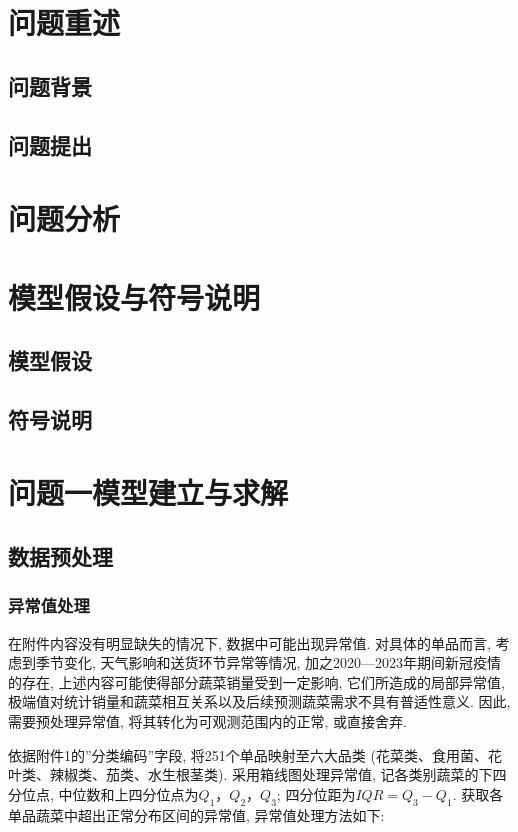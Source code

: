 \documentclass{MathNoteCN}
\begin{document}
\section{问题重述}%
\subsection{问题背景}
\subsection{问题提出}
\section{问题分析}%
\section{模型假设与符号说明}%
\subsection{模型假设}
\subsection{符号说明}
\section{问题一模型建立与求解}%

\subsection{数据预处理}

\subsubsection{异常值处理}
在附件内容没有明显缺失的情况下, 数据中可能出现异常值. 对具体的单品而言, 考虑到季节变化, 天气影响和送货环节异常等情况, 加之2020—2023年期间新冠疫情的存在, 上述内容可能使得部分蔬菜销量受到一定影响, 它们所造成的局部异常值, 极端值对统计销量和蔬菜相互关系以及后续预测蔬菜需求不具有普适性意义. 因此, 需要预处理异常值, 将其转化为可观测范围内的正常, 或直接舍弃. 

依据附件1的''分类编码''字段, 将251个单品映射至六大品类 (花菜类、食用菌、花叶类、辣椒类、茄类、水生根茎类). 采用箱线图处理异常值, 记各类别蔬菜的下四分位点, 中位数和上四分位点为$Q_1$，$Q_2$，$Q_3$; 四分位距为$IQR=Q_3-Q_1$. 获取各单品蔬菜中超出正常分布区间的异常值, 异常值处理方法如下:
\end{document}
